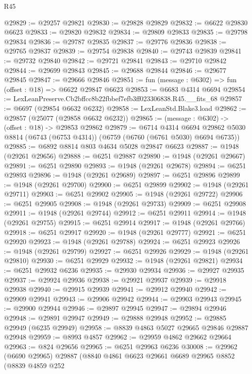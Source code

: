 \begin{lexlean}{R45}
\begin{coremodule}
{@29829 := @29257 @29821
@29830 := @29828 @29829
@29832 := @6622 @29830 @6623
@29833 := @29820 @29832
@29834 := @29809 @29833
@29835 := @29798 @29834
@29836 := @29787 @29835
@29837 := @29776 @29836
@29838 := @29765 @29837
@29839 := @29754 @29838
@29840 := @29743 @29839
@29841 := @29732 @29840
@29842 := @29721 @29841
@29843 := @29710 @29842
@29844 := @29699 @29843
@29845 := @29688 @29844
@29846 := @29677 @29845
@29847 := @29666 @29846
@29851 := fun (message : @6302) => fun (offset : @18) => @6622 @29847 @6623
@29853 := @6683 @4314 @6694
@29854 := LexLeanPreserve.Cb2bffcc8b22fbbef7efb3ff023306838.R45.__fits_68
@29857 := @6697 (@29854 @6632 @6232)
@29858 := LexLeanStd.Blake3.load
@29862 := @29857 (@25077 (@29858 @6632 @6232))
@29865 := (message : @6302) -> (offset : @18) -> @29853 @29862
@29879 := @6714
    @4314
    @6694
    @29862
    @5030
    @8814
    (@6743 (@6753 @4314))
    (@6759 (@6760 (@6761 @5030) @6694 @6735))
@29885 := @6892 @8814 @803 @4634 @5028 @29847 @6623
@29887 := @1948 (@29261 @29656)
@29888 := @6251 @29887
@29890 := @1948 (@29261 @29667)
@29891 := @6251 @29890
@29893 := @1948 (@29261 @29678)
@29894 := @6251 @29893
@29896 := @1948 (@29261 @29689)
@29897 := @6251 @29896
@29899 := @1948 (@29261 @29700)
@29900 := @6251 @29899
@29902 := @1948 (@29261 @29711)
@29903 := @6251 @29902
@29905 := @1948 (@29261 @29722)
@29906 := @6251 @29905
@29908 := @1948 (@29261 @29733)
@29909 := @6251 @29908
@29911 := @1948 (@29261 @29744)
@29912 := @6251 @29911
@29914 := @1948 (@29261 @29755)
@29915 := @6251 @29914
@29917 := @1948 (@29261 @29766)
@29918 := @6251 @29917
@29920 := @1948 (@29261 @29777)
@29921 := @6251 @29920
@29923 := @1948 (@29261 @29788)
@29924 := @6251 @29923
@29926 := @1948 (@29261 @29799)
@29927 := @6251 @29926
@29929 := @1948 (@29261 @29810)
@29930 := @6251 @29929
@29932 := @1948 (@29261 @29821)
@29934 := @6251 @29932 @6236
@29935 := @29930 @29934
@29936 := @29927 @29935
@29937 := @29924 @29936
@29938 := @29921 @29937
@29939 := @29918 @29938
@29940 := @29915 @29939
@29941 := @29912 @29940
@29942 := @29909 @29941
@29943 := @29906 @29942
@29944 := @29903 @29943
@29945 := @29900 @29944
@29946 := @29897 @29945
@29947 := @29894 @29946
@29948 := @29891 @29947
@29949 := @29888 @29948
@29952 := @29885 @29949 (@6235 @29949)
@29958 := @8839 @4863 @5027 @29665 @29846 @29887 @29948
@29959 := @8993 @4857
@29962 := @29959 @4862 @29662 @29664
@29963 := @824 @29656
@29965 := @6251 @29963 @6236
@30008 := @29962
    (@6690 @29965)
    @29887
    (@8840
      @4861
      @6623
      @29661
      @6689
      @29965
      @8852
      (@8839
        @4859
        @252
}
\end{coremodule}
\end{lexlean}
